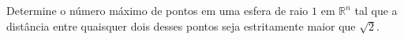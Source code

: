 Determine o número máximo de pontos em uma esfera de raio \(1\) em \(\mathbb{R}^n\) tal que a distância entre quaisquer dois desses pontos seja estritamente maior que \(\sqrt{2}\).
